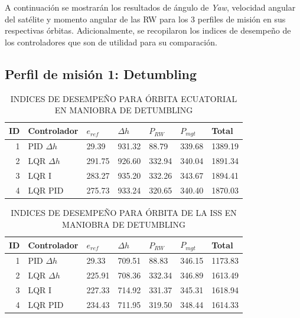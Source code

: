 A continuación se mostrarán los resultados de ángulo de \textit{Yaw}, velocidad angular del satélite y momento angular de las RW para los 3 perfiles de misión en sus respectivas órbitas. Adicionalmente, se recopilaron los indices de desempeño de los controladores que son de utilidad para su comparación. 
\newpage
\subsection{Perfil de misión 1: Detumbling}
 
\begin{table}[!h]
	\label{table:Detumbling_ecuatorial}
	\caption{\MakeUppercase{Indices de desempeño para órbita ecuatorial en maniobra de Detumbling}}
	\centering
	\begin{tabular}{r|lllll|l}
		\multicolumn{1}{l|}{\textbf{ID}} & \textbf{Controlador}                  & \mbox{\boldmath$e_{ref}$}   & \mbox{\boldmath$\Delta h$} & \mbox{\boldmath$P_{RW}$}   & \mbox{\boldmath$P_{mgt}$}    & \textbf{Total}      \\ 
		\hline
		1                       & PID $\Delta h$ & 29.39  & 931.32     & 88.79  & 339.68 & 1389.19  \\
		2                       & LQR $\Delta h$ & 291.75 & 926.60   & 332.94 & 340.04 & 1891.34  \\
		3                       & LQR I          & 283.27 & 935.20     & 332.26 & 343.67 & 1894.41  \\
		4                       & LQR PID        & 275.73& 933.24      & 320.65 & 340.40 & 1870.03  \\
		\hline
	\end{tabular}
\end{table}


\begin{table}[!h]
	\label{table:Detumbling_iss}
	\caption{\MakeUppercase{Indices de desempeño para órbita de la ISS en maniobra de Detumbling }}
	\centering
	\begin{tabular}{r|lllll|l}
		\multicolumn{1}{l|}{\textbf{ID}} & \textbf{Controlador}                  & \mbox{\boldmath$e_{ref}$}   & \mbox{\boldmath$\Delta h$} & \mbox{\boldmath$P_{RW}$}   & \mbox{\boldmath$P_{mgt}$}    & \textbf{Total}      \\ 
		\hline
		1                       & PID $\Delta h$ & 29.33  & 709.51     & 88.83  & 346.15 & 1173.83  \\
		2                       & LQR $\Delta h$ & 225.91 & 708.36     & 332.34 & 346.89 & 1613.49  \\
		3                       & LQR I          & 227.33 & 714.92     & 331.37 & 345.31 & 1618.94  \\
		4                       & LQR PID        & 234.43 & 711.95     & 319.50 & 348.44 & 1614.33  \\
		\hline
	\end{tabular}
\end{table}

